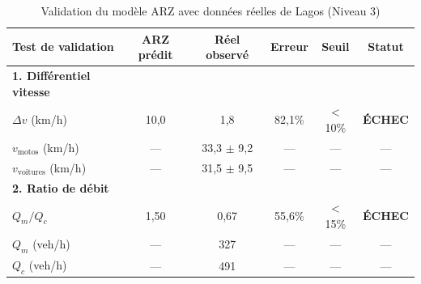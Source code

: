 \begin{table}[H]
    \centering
    \caption{Validation du modèle ARZ avec données réelles de Lagos (Niveau 3)}
    \label{tab:validation_niveau3_real}
    \begin{tabular}{|l|c|c|c|c|c|}
        \hline
        \textbf{Test de validation}          & \textbf{ARZ prédit}                                                    & \textbf{Réel observé} & \textbf{Erreur} & \textbf{Seuil} & \textbf{Statut}                     \\
        \hline
        \textbf{1. Différentiel vitesse}     &                                                                        &                       &                 &                &                                     \\
        \quad $\Delta v$ (km/h)              & 10,0                                                                   & 1,8                   & 82,1\%          & < 10\%         & \cellcolor{red!30}\textbf{ÉCHEC}    \\
        \quad $v_{\text{motos}}$ (km/h)      & —                                                                      & 33,3 $\pm$ 9,2        & —               & —              & —                                   \\
        \quad $v_{\text{voitures}}$ (km/h)   & —                                                                      & 31,5 $\pm$ 9,5        & —               & —              & —                                   \\
        \hline
        \textbf{2. Ratio de débit}           &                                                                        &                       &                 &                &                                     \\
        \quad $Q_m / Q_c$                    & 1,50                                                                   & 0,67                  & 55,6\%          & < 15\%         & \cellcolor{red!30}\textbf{ÉCHEC}    \\
        \quad $Q_m$ (veh/h)                  & —                                                                      & 327                   & —               & —              & —                                   \\
        \quad $Q_c$ (veh/h)                  & —                                                                      & 491                   & —               & —              & —                                   \\

\end{tabular}
\end{table}

